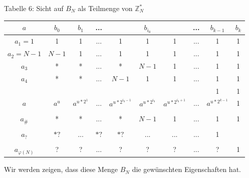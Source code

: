 \documentclass[a4paper]{article}
\begin{document}
\begin{multicols}{3}
        Tabelle 6: Sicht auf $B_N$ als Teilmenge von $\mathbb{Z}^*_N$
        \begin{tabular}{c|c|c|c|c|c|c|c|c|c}
            $a$       & $b_0$ & $b_1$    & ... &          & $b_{i_0}$    &          & ... & $b_{k-1}$    & $b_k$                        \\\hline
            $a_1=1$     & 1   & 1      & ... & 1         & 1        & 1         & ... & 1        & 1                                    \\
            $a_2=N-1$    & $N-1$ & 1      & ... & 1         & 1        & 1         & ... & 1        & 1                                 \\
            $a_3$      & *   & *      & ... & *         & $N-1$      & 1         & ... & 1        & 1                                   \\
            $a_4$      & *   & *      & ... & $N-1$       & 1        & 1         & ... & 1        & 1                                   \\
                    &    &       &   &          &         &          &   & 1        & 1                                                 \\
            $a$       & $a^u$ & $a^{u*2^1}$ & ... & $a^{u*2^{i_0-1}}$ & $a^{u*2^{i_0}}$ & $a^{u*2^{i_0+1}}$ & ... & $a^{u*2^{k-1}}$ & 1 \\
                    &    &       &   &          &         &          &   &         &                                                    \\
            $a_{\#}$      & *   & *      & ... & *         & $N-1$      & 1         & ... & 1        & 1                                \\
                    &    &       &   &          &         &          &   &         &                                                    \\
            $a_?$      & $*?$ & ...     & $*?$ & $*?$       & ...       & ...        & ... & 1        &                                 \\
                    &    &       &   &          &         &          &   &         &                                                    \\
            $a_{\varphi(N)}$ & ?   & ?      & ... & ?         & ?        & ?         & ... & ?        & 1
        \end{tabular}


        Wir werden zeigen, dass diese Menge $B_N$ die gewünschten Eigenschaften hat.


\end{multicols}
\end{document}
